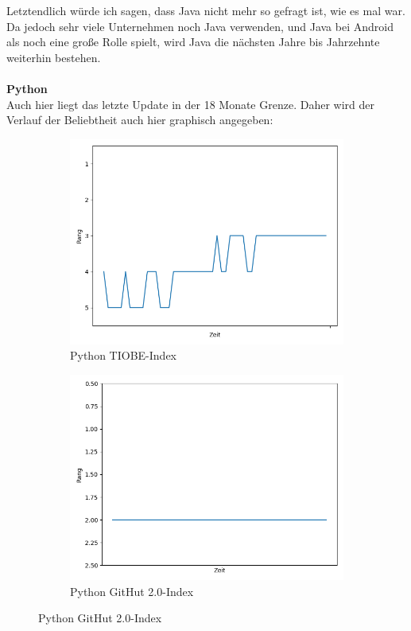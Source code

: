 \documentclass[ngerman]{article}
\begin{document}
    Letztendlich würde ich sagen, dass Java nicht mehr so gefragt ist, wie es mal war. Da jedoch sehr viele Unternehmen noch Java verwenden, und Java bei Android als noch eine große Rolle spielt, wird Java die nächsten Jahre bis Jahrzehnte weiterhin bestehen.\\\\
    \textbf{Python}\\
    Auch hier liegt das letzte Update in der 18 Monate Grenze. Daher wird der Verlauf der Beliebtheit auch hier graphisch angegeben:
    \begin{figure}[h!]
        \begin{subfigure}[h!]{.5\textwidth}
            \caption{Python TIOBE-Index}
            \centering
            \includegraphics[scale=.25]{PythonTIOBE.png}
        \end{subfigure}
        \begin{subfigure}[h!]{.5\textwidth}
            \caption{Python GitHut 2.0-Index}
            \centering
            \includegraphics[scale=.25]{PythonGitHut.png}
        \end{subfigure}
    \end{figure}\\
\end{document}
